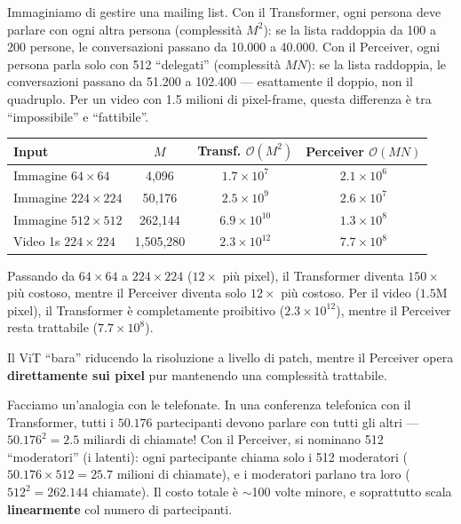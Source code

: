 \documentclass[12pt,a4paper]{article}
\begin{document}
\begin{notabox}
Immaginiamo di gestire una mailing list. Con il Transformer, ogni persona deve parlare con ogni altra persona (complessit\`a $M^2$): se la lista raddoppia da 100 a 200 persone, le conversazioni passano da 10.000 a 40.000. Con il Perceiver, ogni persona parla solo con 512 ``delegati'' (complessit\`a $MN$): se la lista raddoppia, le conversazioni passano da 51.200 a 102.400 --- esattamente il doppio, non il quadruplo. Per un video con 1.5 milioni di pixel-frame, questa differenza \`e tra ``impossibile'' e ``fattibile''.
\end{notabox}

\begin{examplebox}
\begin{center}
\begin{tabular}{@{}lccc@{}}
\toprule
\textbf{Input} & $M$ & \textbf{Transf. $\mathcal{O}(M^2)$} & \textbf{Perceiver $\mathcal{O}(MN)$} \\
\midrule
Immagine $64 \times 64$ & 4{,}096 & $1.7 \times 10^7$ & $2.1 \times 10^6$ \\
Immagine $224 \times 224$ & 50{,}176 & $2.5 \times 10^9$ & $2.6 \times 10^7$ \\
Immagine $512 \times 512$ & 262{,}144 & $6.9 \times 10^{10}$ & $1.3 \times 10^8$ \\
Video 1s $224 \times 224$ & 1{,}505{,}280 & $2.3 \times 10^{12}$ & $7.7 \times 10^8$ \\
\bottomrule
\end{tabular}
\end{center}

Passando da $64 \times 64$ a $224 \times 224$ ($12\times$ pi\`u pixel), il Transformer diventa $150\times$ pi\`u costoso, mentre il Perceiver diventa solo $12\times$ pi\`u costoso. Per il video ($1.5$M pixel), il Transformer \`e completamente proibitivo ($2.3 \times 10^{12}$), mentre il Perceiver resta trattabile ($7.7 \times 10^8$).
\end{examplebox}

Il ViT ``bara'' riducendo la risoluzione a livello di patch, mentre il Perceiver opera \textbf{direttamente sui pixel} pur mantenendo una complessit\`a trattabile.

\begin{notabox}
Facciamo un'analogia con le telefonate. In una conferenza telefonica con il Transformer, tutti i $50.176$ partecipanti devono parlare con tutti gli altri --- $50.176^2 = 2.5$ miliardi di chiamate! Con il Perceiver, si nominano 512 ``moderatori'' (i latenti): ogni partecipante chiama solo i 512 moderatori ($50.176 \times 512 = 25.7$ milioni di chiamate), e i moderatori parlano tra loro ($512^2 = 262.144$ chiamate). Il costo totale \`e $\sim$100 volte minore, e soprattutto scala \textbf{linearmente} col numero di partecipanti.
\end{notabox}
\end{document}

